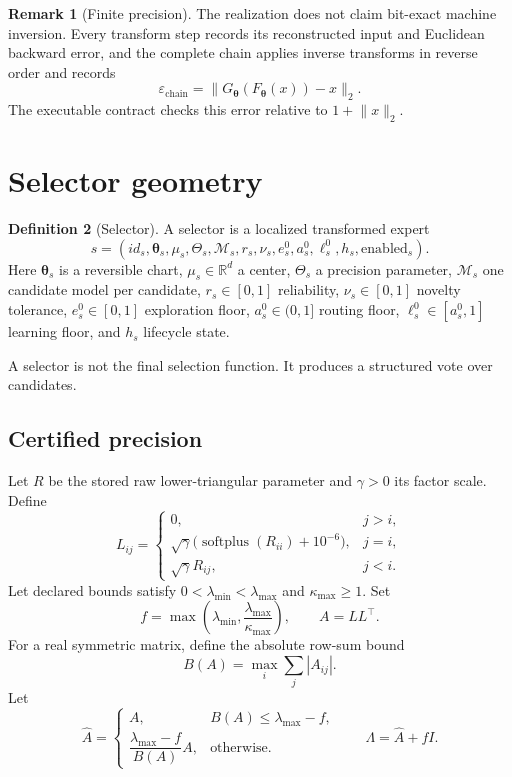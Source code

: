 \documentclass[11pt]{article}
\theoremstyle{definition}
\newtheorem{definition}{Definition}[section]
\newtheorem{remark}[definition]{Remark}
\theoremstyle{plain}
\newcommand{\R}{\mathbb{R}}
\begin{document}
\begin{remark}[Finite precision]
The realization does not claim bit-exact machine inversion.  Every transform
step records its reconstructed input and Euclidean backward error, and the
complete chain applies inverse transforms in reverse order and records
\[
 \varepsilon_{\mathrm{chain}}
 =\lVert G_{\boldsymbol\theta}(F_{\boldsymbol\theta}(x))-x\rVert_2.
\]
The executable contract checks this error relative to $1+\lVert x\rVert_2$.
\end{remark}

\section{Selector geometry}

\begin{definition}[Selector]
A selector is a localized transformed expert
\[
s=(id_s,\boldsymbol\theta_s,\mu_s,\Theta_s,\mathcal M_s,
   r_s,\nu_s,e_s^0,a_s^0,\ell_s^0,h_s,\mathrm{enabled}_s).
\]
Here $\boldsymbol\theta_s$ is a reversible chart, $\mu_s\in\R^d$ a center,
$\Theta_s$ a precision parameter, $\mathcal M_s$ one candidate model per
candidate, $r_s\in[0,1]$ reliability, $\nu_s\in[0,1]$ novelty tolerance,
$e_s^0\in[0,1]$ exploration floor, $a_s^0\in(0,1]$ routing floor,
$\ell_s^0\in[a_s^0,1]$ learning floor, and $h_s$ lifecycle state.
\end{definition}

A selector is not the final selection function.  It produces a structured
vote over candidates.

\subsection{Certified precision}

Let $R$ be the stored raw lower-triangular parameter and $\gamma>0$ its factor
scale.  Define
\[
L_{ij}=
\begin{cases}
0,&j>i,\\
\sqrt{\gamma}\bigl(\operatorname{softplus}(R_{ii})+10^{-6}\bigr),&j=i,\\
\sqrt{\gamma}R_{ij},&j<i.
\end{cases}
\]
Let declared bounds satisfy
$0<\lambda_{\min}<\lambda_{\max}$ and
$\kappa_{\max}\ge1$.  Set
\[
 f=\max\left(\lambda_{\min},
       \frac{\lambda_{\max}}{\kappa_{\max}}\right),\qquad A=LL^\top.
\]
For a real symmetric matrix, define the absolute row-sum bound
\[
 B(A)=\max_i\sum_j |A_{ij}|.
\]
Let
\[
\widehat A=
\begin{cases}
A,&B(A)\le \lambda_{\max}-f,\\[1mm]
\dfrac{\lambda_{\max}-f}{B(A)}A,&\text{otherwise}.
\end{cases}
\qquad
\Lambda=\widehat A+fI.
\]
\end{document}
